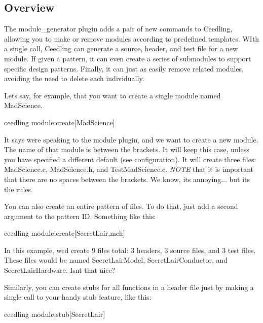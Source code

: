 \subsection*{Overview}

The module\+\_\+generator plugin adds a pair of new commands to Ceedling, allowing you to make or remove modules according to predefined templates. W\+Ith a single call, Ceedling can generate a source, header, and test file for a new module. If given a pattern, it can even create a series of submodules to support specific design patterns. Finally, it can just as easily remove related modules, avoiding the need to delete each individually.

Let\textquotesingle{}s say, for example, that you want to create a single module named {\ttfamily Mad\+Science}.


\begin{DoxyCode}
ceedling module:create[MadScience]
\end{DoxyCode}


It says we\textquotesingle{}re speaking to the module plugin, and we want to create a new module. The name of that module is between the brackets. It will keep this case, unless you have specified a different default (see configuration). It will create three files\+: {\ttfamily Mad\+Science.\+c}, {\ttfamily Mad\+Science.\+h}, and {\ttfamily Test\+Mad\+Science.\+c}. {\itshape N\+O\+TE} that it is important that there are no spaces between the brackets. We know, it\textquotesingle{}s annoying... but it\textquotesingle{}s the rules.

You can also create an entire pattern of files. To do that, just add a second argument to the pattern ID. Something like this\+:


\begin{DoxyCode}
ceedling module:create[SecretLair,mch]
\end{DoxyCode}


In this example, we\textquotesingle{}d create 9 files total\+: 3 headers, 3 source files, and 3 test files. These files would be named {\ttfamily Secret\+Lair\+Model}, {\ttfamily Secret\+Lair\+Conductor}, and {\ttfamily Secret\+Lair\+Hardware}. Isn\textquotesingle{}t that nice?

Similarly, you can create stubs for all functions in a header file just by making a single call to your handy {\ttfamily stub} feature, like this\+:


\begin{DoxyCode}
ceedling module:stub[SecretLair]
\end{DoxyCode}


